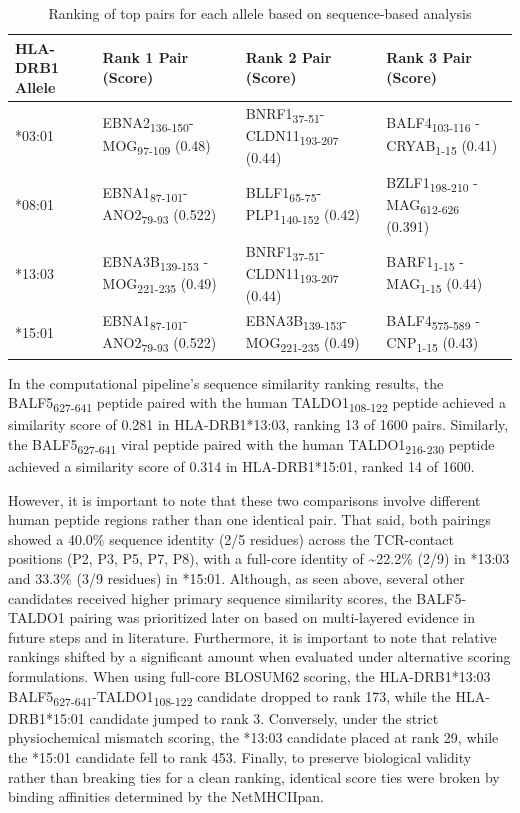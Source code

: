 \documentclass[11pt]{article}
\begin{document}
\begin{table}[htbp]\centering\footnotesize
\caption{Ranking of top pairs for each allele based on sequence-based analysis}
\setlength{\tabcolsep}{3pt}\renewcommand{\arraystretch}{1.25}
\begin{tabular}{p{}p{}p{}p{}}
\toprule
HLA-DRB1 Allele & Rank 1 Pair (Score) & Rank 2 Pair (Score) & Rank 3 Pair (Score) \\
\midrule
*03:01 & EBNA2\textsubscript{136-150}- MOG\textsubscript{97-109} (0.48) & BNRF1\textsubscript{37-51}- CLDN11\textsubscript{193-207} (0.44) & BALF4\textsubscript{103-116} - CRYAB\textsubscript{1-15} (0.41) \\
*08:01 & EBNA1\textsubscript{87-101}- ANO2\textsubscript{79-93} (0.522) & BLLF1\textsubscript{65-75}-PLP1\textsubscript{140-152} (0.42) & BZLF1\textsubscript{198-210} - MAG\textsubscript{612-626} (0.391) \\
*13:03 & EBNA3B\textsubscript{139-153} - MOG\textsubscript{221-235} (0.49) & BNRF1\textsubscript{37-51}- CLDN11\textsubscript{193-207} (0.44) & BARF1\textsubscript{1-15} - MAG\textsubscript{1-15} (0.44) \\
*15:01 & EBNA1\textsubscript{87-101}- ANO2\textsubscript{79-93} (0.522) & EBNA3B\textsubscript{139-153}-MOG\textsubscript{221-235} (0.49) & BALF4\textsubscript{575-589} - CNP\textsubscript{1-15} (0.43) \\
\bottomrule\end{tabular}\end{table}
In the computational pipeline’s sequence similarity ranking results, the BALF5\textsubscript{627-641} peptide paired with the human TALDO1\textsubscript{108-122} peptide achieved a similarity score of 0.281 in HLA-DRB1*13:03, ranking 13 of 1600 pairs. Similarly, the BALF5\textsubscript{627-641} viral peptide paired with the human TALDO1\textsubscript{216-230} peptide achieved a similarity score of 0.314 in HLA-DRB1*15:01, ranked 14 of 1600.

However, it is important to note that these two comparisons involve different human peptide regions rather than one identical pair. That said, both pairings showed a 40.0\% sequence identity (2/5 residues) across the TCR-contact positions (P2, P3, P5, P7, P8), with a full-core identity of \textasciitilde{}22.2\% (2/9) in *13:03 and 33.3\% (3/9 residues) in *15:01. Although, as seen above, several other candidates received higher primary sequence similarity scores, the BALF5-TALDO1 pairing was prioritized later on based on multi-layered evidence in future steps and in literature. Furthermore, it is important to note that relative rankings shifted by a significant amount when evaluated under alternative scoring formulations. When using full-core BLOSUM62 scoring, the HLA-DRB1*13:03 BALF5\textsubscript{627-641}-TALDO1\textsubscript{108-122} candidate dropped to rank 173, while the HLA-DRB1*15:01 candidate jumped to rank 3. Conversely, under the strict physiochemical mismatch scoring, the *13:03 candidate placed at rank 29, while the *15:01 candidate fell to rank 453. Finally, to preserve biological validity rather than breaking ties for a clean ranking, identical score ties were broken by binding affinities determined by the NetMHCIIpan.
\end{document}
